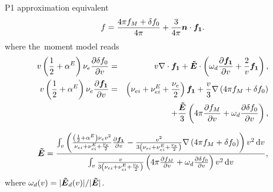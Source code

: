 P1 approximation equivalent
\begin{equation}
  f = \frac{4\pi f_M + \delta f_0}{4\pi} + \frac{3}{4\pi}\boldsymbol{n}\cdot\boldsymbol{f_1} .
  \label{eq:OOE_P1outofeq}
\end{equation}
where the~moment model reads
\begin{eqnarray}
  v \left(\frac{1}{2} + \alpha^E\right)\nu_{e}\frac{\partial{\delta f_0}}{\partial{v}} &=&
  v\nabla\cdot\boldsymbol{f_1} + \boldsymbol{\tilde{E}}\cdot\left(\omega_d \frac{\partial{\boldsymbol{f_1}}}{\partial{v}} 
  + \frac{2}{v}\boldsymbol{f_1}\right) , 
  \nonumber\\
  v \left(\frac{1}{2} + \alpha^E\right)\nu_{e}\frac{\partial{\boldsymbol{f_1}}}{\partial{v}} 
  &=& \left(\nu_{ei} + \nu_{ei}^E + \frac{\nu_{e}}{2}\right)\boldsymbol{f_1} 
  + \frac{v}{3}\nabla\left(4\pi f_M + \delta f_0\right)
  \nonumber \\
  && 
  + \frac{\boldsymbol{\tilde{E}}}{3}\left(4\pi \frac{\partial{f_M}}{\partial{v}} + \omega_d \frac{\partial{\delta f_0}}{\partial{v}} 
  \right) ,
  \nonumber
\end{eqnarray}

\begin{equation}
  \boldsymbol{\tilde{E}} =
  \frac{\int_{v} \left(\frac{\left(\frac{1}{2} + \alpha^E\right)\nu_{e}v^2}
  {\nu_{ei} + \nu_{ei}^E + \frac{\nu_{e}}{2}}\frac{\partial{\boldsymbol{f_1}}}{\partial{v}}
  - \frac{v^2}{3\left(\nu_{ei} + \nu_{ei}^E + \frac{\nu_{e}}{2}\right)}
  \nabla\left(4\pi f_M + \delta f_0\right)\right) v^2\, \text{d}v}
  {\int_{v} \frac{v}
  {3\left(\nu_{ei} + \nu_{ei}^E + \frac{\nu_{e}}{2}\right)}
  \left(4\pi\frac{\partial{f_M}}{\partial{v}} + \omega_d \frac{\partial{\delta f_0}}{\partial{v}}\right)
  v^2\, \text{d}v} ,
  \nonumber
\end{equation}
where $\omega_d(v) = |\boldsymbol{\tilde{E}}_d(v)| / |\boldsymbol{\tilde{E}}|$.

